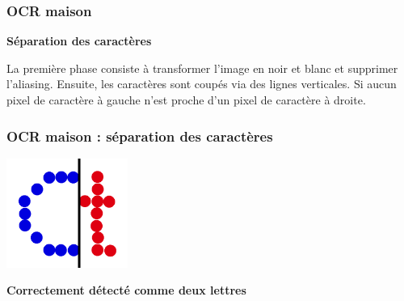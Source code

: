 \documentclass[xcolor=dvipsnames]{beamer}
\begin{document}
\begin{frame}
\frametitle{OCR maison}
    \begin{center}\begin{alertblock}{}
            \begin{center}
            \textbf{\Large Séparation des caractères}
            \end{center}
    \end{alertblock}\end{center}

La première phase consiste à transformer l'image en noir et blanc et supprimer l'aliasing. Ensuite, les caractères sont coupés via des lignes verticales. Si aucun pixel de caractère à gauche n'est proche d'un pixel de caractère à droite.

\end{frame}

\begin{frame}
\frametitle{OCR maison : séparation des caractères}
    \begin{center}
       \includegraphics[width=150px]{10x9_Ct_split.png}
    \end{center}
      \begin{alertblock}{}
            \begin{center}
                  \textbf{\Large Correctement détecté comme deux lettres}
            \end{center}
      \end{alertblock}
\end{frame}
\end{document}
